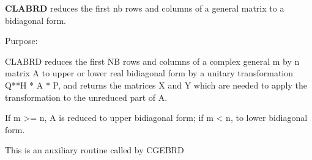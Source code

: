{\bfseries C\+L\+A\+B\+R\+D} reduces the first nb rows and columns of a general matrix to a bidiagonal form. 

 \begin{DoxyParagraph}{Purpose\+: }
\begin{DoxyVerb} CLABRD reduces the first NB rows and columns of a complex general
 m by n matrix A to upper or lower real bidiagonal form by a unitary
 transformation Q**H * A * P, and returns the matrices X and Y which
 are needed to apply the transformation to the unreduced part of A.

 If m >= n, A is reduced to upper bidiagonal form; if m < n, to lower
 bidiagonal form.

 This is an auxiliary routine called by CGEBRD\end{DoxyVerb}
 
\end{DoxyParagraph}

